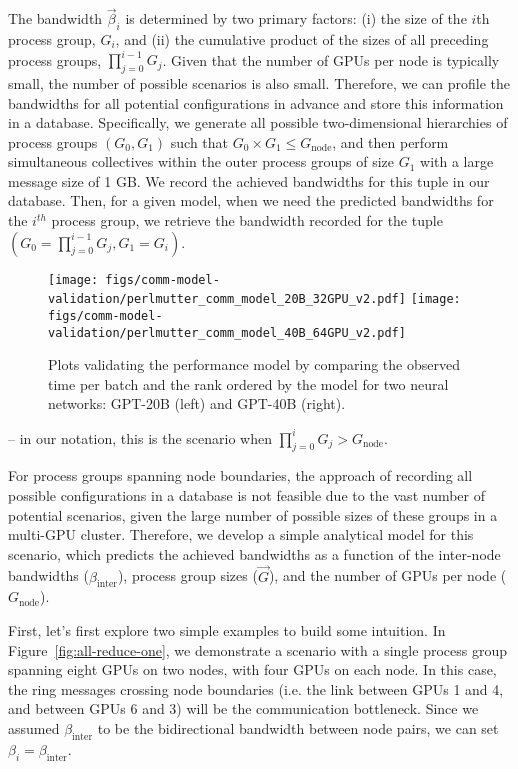 The bandwidth $\vec{\beta}_{i}$ is determined by two primary factors: (i) the
size of the $i$th process group, $G_{i}$, and (ii) the cumulative product of
the sizes of all preceding process groups, $\prod_{j=0}^{i-1}G_{j}$. Given that
the number of GPUs per node is typically small, the number of possible
scenarios is also small. Therefore, we can profile the bandwidths for all
potential configurations in advance and store this information in a database.
Specifically, we generate all possible two-dimensional hierarchies of process
groups $(G_{0}, G_{1})$ such that $G_{0} \times G_{1} \leq G_{\text{node}}$,
and then perform simultaneous collectives within the outer process groups of
size $G_{1}$ with a large message size of 1 GB. We record the achieved
bandwidths for this tuple in our database. Then, for a given model, when we
need the predicted bandwidths for the $i^{th}$ process group, we retrieve the
bandwidth recorded for the tuple $(G_{0} = \prod_{j=0}^{i-1}G_{j}, G_{1} =
G_{i})$.

\begin{figure*}[t]
    \centering
    \texttt{[image: figs/comm-model-validation/perlmutter\_comm\_model\_20B\_32GPU\_v2.pdf]}
    \texttt{[image: figs/comm-model-validation/perlmutter\_comm\_model\_40B\_64GPU\_v2.pdf]}
    \caption{Plots validating the performance model by comparing the observed time per batch and the rank ordered by the model for two neural networks: GPT-20B (left) and GPT-40B (right).}
    \label{fig:rank-comm-model}
\end{figure*}

\vspace{0.08in}
 --
in our notation, this is the scenario when $\prod_{j=0}^{i}G_{j} > G_{\mathrm{node}}$. 

For process groups spanning node boundaries, the approach of recording all
possible configurations in a database is not feasible due to the vast number of
potential scenarios, given the large number of possible sizes of these groups
in a multi-GPU cluster.  Therefore, we develop a simple analytical model for
this scenario, which predicts the achieved bandwidths as a function of the
inter-node bandwidths ($\beta_{\mathrm{inter}}$), process group sizes
($\vec{G}$), and the number of GPUs per node ($G_{\text{node}}$).

First, let's first explore two simple examples to build some intuition. In Figure~\ref{fig:all-reduce-one}, we demonstrate a 
scenario with a single process group spanning eight GPUs on two nodes, with four GPUs on each node. In this case, the ring 
messages crossing node boundaries (i.e. the link between GPUs 1 and 4, and between GPUs 6 and 3) will be the 
communication bottleneck. Since we assumed $\beta_{\mathrm{inter}}$ to be the bidirectional bandwidth between node pairs, we 
can set $\beta_{i}=\beta_{\mathrm{inter}}$.

